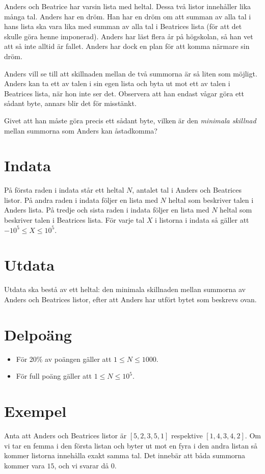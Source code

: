
Anders och Beatrice har varsin lista med heltal. Dessa två listor innehåller lika många tal. Anders har en dröm. Han har en dröm om att summan av alla tal i hans lista ska vara lika med summan av alla tal i Beatrices lista (för att det skulle göra henne imponerad). Anders har läst flera år på högskolan, så han vet att så inte alltid är fallet. Anders har dock en plan för att komma närmare sin dröm.

Anders vill se till att skillnaden mellan de två summorna är så liten som möjligt. Anders kan ta ett av talen i sin egen lista och byta ut mot ett av talen i Beatrices lista, när hon inte ser det. Observera att han endast vågar göra ett sådant byte, annars blir det för misstänkt.

Givet att han måste göra precis ett sådant byte, vilken är den \emph{minimala skillnad} mellan summorna som Anders kan åstadkomma?

\section*{Indata}
På första raden i indata står ett heltal $N$, antalet tal i Anders och Beatrices listor. På andra raden i indata följer en lista med $N$ heltal som beskriver talen i Anders lista. På tredje och sista raden i indata följer en lista med $N$ heltal som beskriver talen i Beatrices lista. För varje tal $X$ i listorna i indata så gäller att $-10^5 \leq X \leq 10^5$.

\section*{Utdata}
Utdata ska bestå av ett heltal: den minimala skillnaden mellan summorna av Anders och Beatrices listor, efter att Anders har utfört bytet som beskrevs ovan.

\section*{Delpoäng}
\begin{itemize}
\item För 20\% av poängen gäller att $1 \leq N \leq 1000$.
\item För full poäng gäller att $1 \leq N \leq 10^{5}$.
\end{itemize}

\section*{Exempel}
Anta att Anders och Beatrices listor är $[5,2,3,5,1]$ respektive $[1,4,3,4,2]$. Om vi tar en femma i den första listan och byter ut mot en fyra i den andra listan så kommer listorna innehålla exakt samma tal. Det innebär att båda summorna kommer vara $15$, och vi svarar då $0$.
